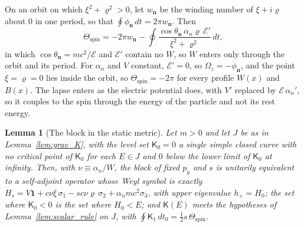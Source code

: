 \documentclass[aps,prd,onecolumn,tightenlines,nofootinbib,notitlepage,11pt,floatfix]{revtex4-2}
\theoremstyle{indentedtheorem}
\newtheorem{lemma}{Lemma}
\begin{document}
\noindent On an orbit on which $\xi^2+\varrho^2>0$, let $w_\mathbf{n}$ be the winding number of $\xi+i\varrho$ about $0$ in one period, so that $\oint\dot{\phi}_\mathbf{n}\,dt=2\pi w_\mathbf{n}$. Then
\begin{equation*}
    \Theta_\text{spin} = -2\pi w_\mathbf{n} - \oint\frac{\cos\theta_\mathbf{n}\,\alpha_n\varrho\,\mathcal{E}'}{\xi^2+\varrho^2}\,dt ,
\end{equation*}
in which $\cos\theta_\mathbf{n}=mc^2/\mathcal{E}$ and $\mathcal{E}'$ contain no $W$, so $W$ enters only through the orbit and its period. For $\alpha_n$ and $V$ constant, $\mathcal{E}'=0$, so $\Omega_z=-\dot{\phi}_\mathbf{n}$, and the point $\xi=\varrho=0$ lies inside the orbit, so $\Theta_\text{spin}=-2\pi$ for every profile $W(x)$ and $B(x)$. The lapse enters as the electric potential does, with $V'$ replaced by $\mathcal{E}\,\alpha_n'$, so it couples to the spin through the energy of the particle and not its rest energy.

\begin{lemma}[The block in the static metric]\label{lem:grav_block}
Let $m>0$ and let $J$ be as in Lemma~\ref{lem:grav_K}, with the level set $\mathsf{K}_0=0$ a single simple closed curve with no critical point of $\mathsf{K}_0$ for each $E\in J$ and $0$ below the lower limit of $\mathsf{K}_0$ at infinity. Then, with $\nu\equiv\alpha_n/W$, the block of fixed $p_y$ and $s$ is unitarily equivalent to a self-adjoint operator whose Weyl symbol is exactly $H_s=V\mathbf{1}+c\nu\xi\,\sigma_1-sc\nu\varrho\,\sigma_2+\alpha_nmc^2\sigma_3$, with upper eigenvalue $h_+=H_0$; the set where $\mathsf{K}_0<0$ is the set where $H_0<E$; and $\mathsf{K}(E)$ meets the hypotheses of Lemma~\ref{lem:scalar_rule} on $J$, with $\oint\mathsf{K}_1\,dt_0=\tfrac{1}{2}s\,\Theta_\text{spin}$.
\end{lemma}
\end{document}
